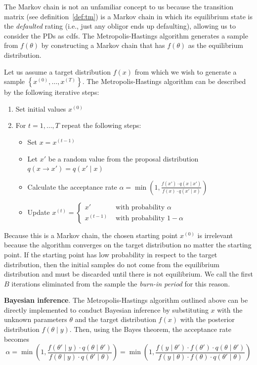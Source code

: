 \documentclass[11pt,fleqn]{book} %
\begin{document}
The Markov chain is not an unfamiliar concept to us because the transition 
matrix (see definition~\ref{def:tm}) is a Markov chain in which its 
equilibrium state is the \emph{defaulted} rating (i.e., just any 
obligor ends up defaulting), allowing us to consider the PDs as cdfs.
The Metropolis-Hastings algorithm generates a sample from $f(\theta)$ 
by constructing a Markov chain that has $f(\theta)$ as the equilibrium 
distribution.

\begin{algorithm}
	Let us assume a target distribution $f(x)$ from which we wish to 
	generate a sample $\left\{x^{(0)},\dots,x^{(T)}\right\}$. The 
	Metropolis-Hastings algorithm can be described by the following 
	iterative steps:
	\begin{enumerate}
		\item Set initial values $x^{(0)}$
		\item For $t=1,\dots,T$ repeat the following steps:
		\begin{itemize}
			\item Set $x=x^{(t-1)}$
			\item Let $x'$ be a random value from the proposal distribution 
			$q(x \to x')=q(x' \mid x)$
			\item Calculate the acceptance rate 
			$\alpha = \min\left(1,\frac{f(x') \cdot q(x \mid x')}{f(x) \cdot q(x' \mid x)}\right)$
			\item Update $x^{(t)}=\left\{
			\begin{array}{ll}
				x'        & \text{ with probability } \alpha   \\
				x^{(t-1)} & \text{ with probability } 1-\alpha 
			\end{array}\right.$ 
		\end{itemize}
	\end{enumerate}
\end{algorithm}

Because this is a Markov chain, the chosen starting point $x^{(0)}$ is 
irrelevant because the algorithm converges on the target distribution
no matter the starting point. If the starting point has low probability 
in respect to the target distribution, then the initial samples do not 
come from the equilibrium distribution and must be discarded until there 
is not equilibrium. We call the first $B$ iterations eliminated from the 
sample the \emph{burn-in period} for this reason.

\textbf{Bayesian inference}.
The Metropolis-Hastings algorithm outlined above can be directly implemented 
to conduct Bayesian inference by substituting $x$ with the unknown parameters 
$\theta$ and the target distribution $f(x)$ with the posterior distribution 
$f(\theta \mid y)$. Then, using the Bayes theorem, the acceptance rate 
becomes
\begin{displaymath}
	\alpha = \min\left(1,\frac{f(\theta' \mid y) \cdot q(\theta \mid \theta')}{f(\theta \mid y) \cdot q(\theta' \mid \theta)}\right) = \min\left(1,\frac{f(y \mid \theta') \cdot f(\theta') \cdot q(\theta \mid \theta')}{f(y \mid \theta)  \cdot f(\theta) \cdot q(\theta' \mid \theta)}\right)
\end{displaymath}
\end{document}
